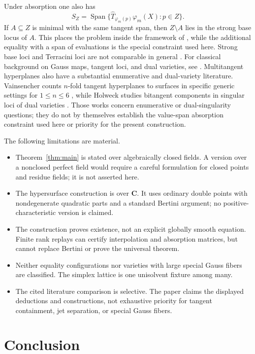 \documentclass[11pt]{article}
\newcommand{\CC}{\mathbf C}
\newcommand{\Span}{\operatorname{Span}}
\begin{document}
Under absorption one also has
\[
 S_Z=\Span\{\widehat T_{\varphi_m(p)}\varphi_m(X):p\in Z\}.
\]
If $A\subseteq Z$ is minimal with the same tangent span, then
$Z\setminus A$ lies in the strong base locus of $A$.  This places the problem
inside the framework of \cite{BallicoBrambillaSantarsiero2026}, while the
additional equality with a span of evaluations is the special constraint
used here.  Strong base loci and Terracini loci are not comparable in general
\cite{BallicoBrambillaSantarsiero2026}.
For classical background on Gauss maps, tangent loci, and dual varieties, see
\cite{Zak1993}.
Multitangent hyperplanes also have a substantial enumerative and dual-variety
literature.  Vainsencher counts $n$-fold tangent hyperplanes to surfaces in
specific generic settings for $1\leq n\leq6$ \cite{Vainsencher1995}, while
Holweck studies bitangent components in singular loci of dual varieties
\cite{Holweck2011}.  Those works concern enumerative or dual-singularity
questions; they do not by themselves establish the value-span absorption
constraint used here or priority for the present construction.

The following limitations are material.
\begin{itemize}
\item Theorem~\ref{thm:main} is stated over algebraically closed fields.  A
version over a nonclosed perfect field would require a careful formulation for
closed points and residue fields; it is not asserted here.
\item The hypersurface construction is over $\CC$.  It uses ordinary double
points with nondegenerate quadratic parts and a standard Bertini argument;
no positive-characteristic version is claimed.
\item The construction proves existence, not an explicit globally smooth
equation.  Finite rank replays can certify interpolation and absorption
matrices, but cannot replace Bertini or prove the universal theorem.
\item Neither equality configurations nor varieties with large special Gauss
fibers are classified.  The simplex lattice is one unisolvent fixture among
many.
\item The cited literature comparison is selective.  The paper claims the
displayed deductions and constructions, not exhaustive priority for tangent
containment, jet separation, or special Gauss fibers.
\end{itemize}

\section{Conclusion}
\end{document}
